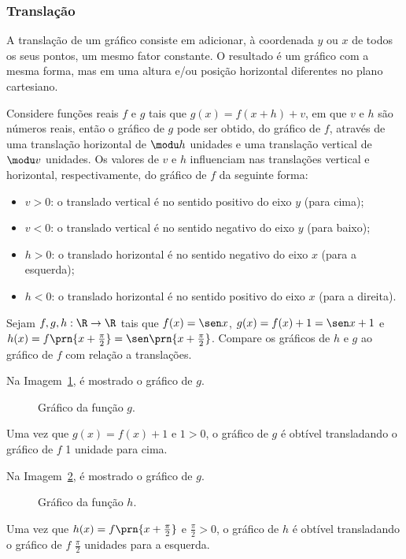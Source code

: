 \subsubsection{Translação}

A translação de um gráfico consiste em adicionar, à coordenada $y$ ou $x$ de todos os seus pontos, um mesmo fator constante.
O resultado é um gráfico com a mesma forma, mas em uma altura e/ou posição horizontal diferentes no plano cartesiano.

Considere funções reais $f$ e $g$ tais que $g(x) = f(x+h) + v$, em que $v$ e $h$ são números reais,
então o gráfico de $g$ pode ser obtido, do gráfico de $f$, através
de uma translação horizontal de $\modu h$ unidades e uma
translação vertical de $\modu v$ unidades.
Os valores de $v$ e $h$ influenciam nas translações vertical e horizontal, respectivamente, do gráfico de $f$ da seguinte forma:

\begin{itemize}
  \item $v > 0$: o translado vertical é no sentido positivo do eixo $y$ (para cima);
  \item $v < 0$: o translado vertical é no sentido negativo do eixo $y$ (para baixo);
  \item $h > 0$: o translado horizontal é no sentido negativo do eixo $x$ (para a esquerda);
  \item $h < 0$: o translado horizontal é no sentido positivo do eixo $x$ (para a direita).
\end{itemize}

\begin{example}
Sejam $f,g,h:\R \to \R$ tais que $f(x) = \sen x$, $g(x) = f(x) + 1 = \sen x +1$ e $h(x)= f\prn{x+\frac {\pi} 2}= \sen \prn{x+ \frac {\pi} 2}$.
Compare os gráficos de $h$ e $g$ ao gráfico de $f$ com relação a translações.
\end{example}

\begin{solution}
Na Imagem~\ref{img:grafico-translacao-exemplo-g}, é mostrado o gráfico de $g$.
%
  \begin{figure}
    \centering
    
    \caption{Gráfico da função $g$.}
    \label{img:grafico-translacao-exemplo-g}
  \end{figure}
%
\noindent Uma vez que $g(x) = f(x)+1$ e $1>0$, o gráfico de $g$ é obtível transladando o gráfico de $f$ 1 unidade para cima.

Na Imagem~\ref{img:grafico-translacao-exemplo-h}, é mostrado o gráfico de $g$.
%
  \begin{figure}
    \centering
    
    \caption{Gráfico da função $h$.}
    \label{img:grafico-translacao-exemplo-h}
  \end{figure}
%
\noindent Uma vez que $h(x) = f\prn{x+\frac {\pi} 2}$ e $\frac {\pi} 2>0$, o gráfico de $h$ é obtível transladando o gráfico de $f$ $\frac {\pi} 2$ unidades para a esquerda.
\end{solution}    
